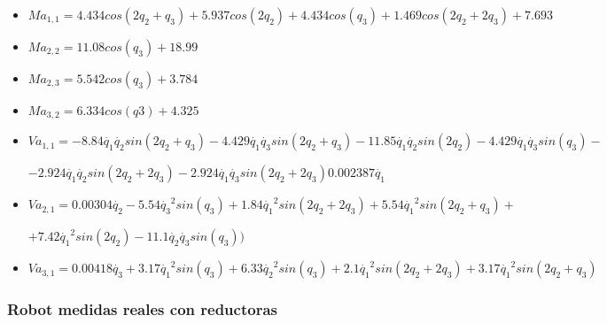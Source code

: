 \begin{itemize}

	\item $ Ma_{1,1}=4.434cos(2q_{2} + q_{3}) + 5.937cos(2q_{2}) + 4.434cos(q_{3}) + 1.469cos(2q_{2} + 2q_{3}) + 7.693$ \\ \vspace{0.2cm}

	\item $ Ma_{2,2}=11.08cos(q_{3}) + 18.99$ \\ \vspace{0.2cm}

	\item $ Ma_{2,3}=5.542cos(q_{3}) + 3.784$ \\ \vspace{0.2cm}

	\item $ Ma_{3,2}=6.334cos(q3) + 4.325$ \\ \vspace{0.2cm}

	\item $ Va_{1,1}=-8.84\dot{q_1}\dot{q_2}sin(2q_2 + q_3) - 4.429\dot{q_1}\dot{q_3}sin(2q_2 + q_3)  -11.85\dot{q_1}\dot{q_2}sin(2q_2) - 4.429\dot{q_1}\dot{q_3}sin(q_3)-$ \\ \vspace{0.1cm}

	$-2.924\dot{q_1}\dot{q_2}sin(2q_2 + 2q_3) - 2.924\dot{q_1}\dot{q_3}sin(2q_2 + 2q_3) 0.002387\dot{q_1} $ \\ \vspace{0.2cm}

	\item $ Va_{2,1}=0.00304\dot{q_2} - 5.54\dot{q_3}^{2}sin(q_{3}) + 1.84\dot{q_{1}}^{2}sin(2q_{2} + 2q_{3}) + 5.54\dot{q_1}^{2}sin(2q_{2} + q_{3}) + $ \\ \vspace{0.1cm}

	$ + 7.42\dot{q_1}^{2}sin(2q_{2}) - 11.1\dot{q_{2}}\dot{q_{3}}sin(q_{3}) ) $\\ \vspace{0.2cm}

	\item $ Va_{3,1}=0.00418\dot{q_3} + 3.17\dot{q_1}^{2}sin(q_{3}) + 6.33\dot{q_2}^{2}sin(q_{3}) + 2.1\dot{q_1}^{2}sin(2q_{2} + 2q_{3}) + 3.17\dot{q_1}^{2}sin(2q_{2} + q_{3}) $

\end{itemize}

\subsubsection{Robot medidas reales con reductoras}

